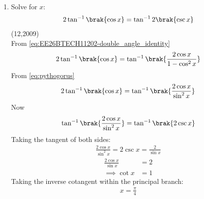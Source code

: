 \begin{enumerate}[label=\thesubsection.\arabic*, ref=\thesubsection.\theenumi]
 
  \begin{align}
  	N &= \sqrt{1 + \sin x} + \sqrt{1 - \sin x}
  	\\
  	&= \brak{\cos\frac{x}{2} + \sin\frac{x}{2}} + \brak{\cos\frac{x}{2} - \sin\frac{x}{2}}
  	\\
  	&= 2\cos\frac{x}{2}
  	\label{eq:EE26BTECH11202-num_signal}
  \end{align}
  \begin{align}
  	D &= \sqrt{1 + \sin x} - \sqrt{1 - \sin x}
  	\\
  	&= \brak{\cos\frac{x}{2} + \sin\frac{x}{2}} - \brak{\cos\frac{x}{2} - \sin\frac{x}{2}}
  	\\
  	&= 2\sin\frac{x}{2}
  	\label{den}
  \end{align}
  \begin{align}
  	\frac{N}{D} = \frac{2\cos\frac{x}{2}}{2\sin\frac{x}{2}} = \cot\frac{x}{2}
  \end{align}
  Substituting LHS
  \begin{align}
  	\text{LHS} = \cot^{-1}\brak{\cot\frac{x}{2}}
  \end{align}
  Since $\frac{x}{2} \in \brak{(0, \frac{\pi}{8}}) \subset \brak{0, \pi}$, which lies strictly within the principal branch of $\cot^{-1}\brak{\theta}$, we obtain:
  \begin{align}
  	\cot^{-1}\brak{\cot\frac{x}{2}} = \frac{x}{2} = \text{RHS}
  \end{align}
  \begin{lstlisting}
  	/codes/q11.py
  \end{lstlisting}
  \item Solve for $x$:
  $$2 \tan^{-1}\brak{\cos x} = \tan^{-1}2 \brak{\csc x}$$ \hfill{(12,2009)} \\
  \solution
  From \eqref{eq:EE26BTECH11202-double_angle_identity}
  \begin{align}
  	2\tan^{-1}\brak{\cos x} = \tan^{-1}\brak{\frac{2\cos x}{1 - \cos^2 x}}
  \end{align}
  From \eqref{eq:pythogorus}
  \begin{align}
  	2\tan^{-1}\brak{\cos x} = \tan^{-1}\brak{\frac{2\cos x}{\sin^2 x}}
  	\label{eq:EE26BTECH11202-lhs_simplified}
  \end{align}
  Now 
  \begin{align}
  	\tan^{-1}\brak{\frac{2\cos x}{\sin^2 x}} = \tan^{-1}\brak{2\csc x}
  \end{align}
  Taking the tangent of both sides:
  \begin{align}
  	\frac{2\cos x}{\sin^2 x} = 2\csc x = \frac{2}{\sin x}
  	\label{eq:EE26BTECH11202-equated_terms}
  \end{align}
  \begin{align}
  	\frac{2\cos x}{\sin x} &= 2
  	\\
  	\implies \cot x &= 1
  \end{align}
  Taking the inverse cotangent within the principal branch:
  \begin{align}
  	x = \frac{\pi}{4}
  \end{align}
  

\end{enumerate}
